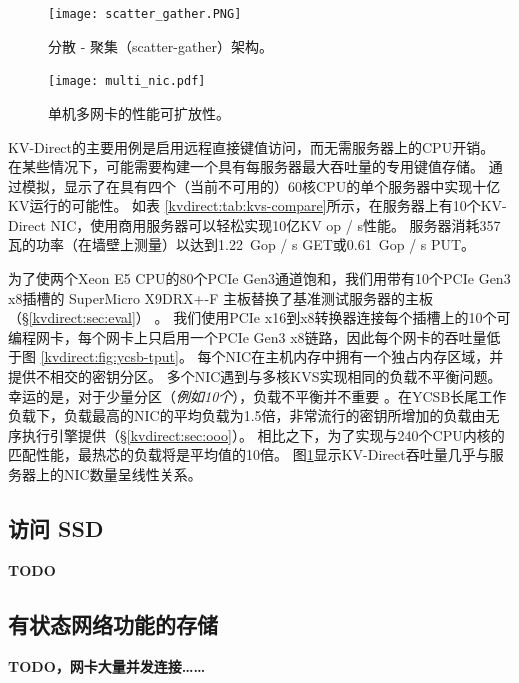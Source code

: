 \begin{figure}[t]
\begin{minipage}[t]{0.5\textwidth}
\centering
\texttt{[image: scatter\_gather.PNG]}
\caption{分散 - 聚集（scatter-gather）架构。}
\label{kvdirect:fig:sg-arch}
\end{minipage}
\begin{minipage}[t]{0.5\textwidth}
\centering
\texttt{[image: multi\_nic.pdf]}
\caption{单机多网卡的性能可扩放性。}
\label{kvdirect:fig:multiple-nics}
\end{minipage}

\end{figure}

KV-Direct的主要用例是启用远程直接键值访问，而无需服务器上的CPU开销。
在某些情况下，可能需要构建一个具有每服务器最大吞吐量的专用键值存储。
通过模拟，\cite {li2016full}显示了在具有四个（当前不可用的）60核CPU的单个服务器中实现十亿KV运行的可能性。
如表 \ref{kvdirect:tab:kvs-compare}所示，在服务器上有10个KV-Direct NIC，使用商用服务器可以轻松实现10亿KV op / s性能。
服务器消耗357瓦的功率（在墙壁上测量）以达到1.22~Gop / s GET或0.61~Gop / s PUT。

为了使两个Xeon E5 CPU的80个PCIe Gen3通道饱和，我们用带有10个PCIe Gen3 x8插槽的 SuperMicro X9DRX+-F 主板替换了基准测试服务器的主板（\S\ref {kvdirect:sec:eval}） 。
我们使用PCIe x16到x8转换器连接每个插槽上的10个可编程网卡，每个网卡上只启用一个PCIe Gen3 x8链路，因此每个网卡的吞吐量低于图 \ref {kvdirect:fig:ycsb-tput}。
每个NIC在主机内存中拥有一个独占内存区域，并提供不相交的密钥分区。
多个NIC遇到与多核KVS实现相同的负载不平衡问题。
幸运的是，对于少量分区（\textit {例如10个}），负载不平衡并不重要 \cite {lim2014mica,li2016full}。在YCSB长尾工作负载下，负载最高的NIC的平均负载为1.5倍，非常流行的密钥所增加的负载由无序执行引擎提供（\S \ref {kvdirect:sec:ooo}）。
相比之下，为了实现与240个CPU内核的匹配性能，最热芯的负载将是平均值的10倍。
图\ref {kvdirect:fig:multiple-nics}显示KV-Direct吞吐量几乎与服务器上的NIC数量呈线性关系。

\subsection{访问 SSD}

\textbf{TODO}


\subsection{有状态网络功能的存储}

\textbf{TODO，网卡大量并发连接……}


